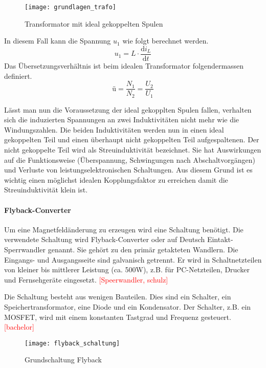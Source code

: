 \begin{figure}[H]
	\centering
	\texttt{[image: grundlagen\_trafo]}
	\caption{Transformator mit ideal gekoppelten Spulen}\label{fig:trafo}
\end{figure}

In diesem Fall kann die Spannung $ u_{1} $ wie folgt berechnet werden.
\begin{equation}\label{eq:induktionsspannung}
u_{1}=L \cdot \frac{\mathrm{d} i_{L}}{\mathrm{d} t}
\end{equation}
Das Übersetzungsverhältnis ist beim idealen Transformator folgendermassen definiert.
\begin{equation}\label{eq:übertragung}
ü= \frac{N_{1}}{N_{2}} = \frac{U_{2}}{U_{1}}
\end{equation}

Lässt man nun die Voraussetzung der ideal gekopplten Spulen fallen, verhalten sich die induzierten Spannungen an zwei Induktivitäten nicht mehr wie die Windungszahlen. Die beiden Induktivitäten werden nun in einen ideal gekoppelten Teil und einen überhaupt nicht gekoppelten Teil aufgespaltenen. Der nicht gekoppelte Teil wird als Streuinduktivität bezeichnet. Sie hat Auswirkungen auf die Funktionsweise (Überspannung, Schwingungen nach Abschaltvorgängen) und Verluste von leistungselektronischen Schaltungen. Aus diesem Grund ist es wichtig einen möglichst idealen Kopplungsfaktor zu erreichen damit die Streuinduktivität klein ist. 

\paragraph{Flyback-Converter}
Um eine Magnetfeldänderung zu erzeugen wird eine Schaltung benötigt. Die verwendete Schaltung wird Flyback-Converter oder auf Deutsch Eintakt-Sperrwandler genannt. Sie gehört zu den primär getakteten Wandlern. Die Eingangs- und Ausgangsseite sind galvanisch getrennt. Er wird in Schaltnetzteilen von kleiner bis mittlerer Leistung (ca. 500W), z.B. für PC-Netzteilen, Drucker und Fernsehgeräte eingesetzt. \textcolor{red}{[Speerwandler, schulz]}

Die Schaltung besteht aus wenigen Bauteilen. Dies sind ein Schalter, ein Speichertransformator, eine Diode und ein Kondensator. Der Schalter, z.B. ein MOSFET, wird mit einem konstanten Tastgrad und Frequenz gesteuert. \textcolor{red}{[bachelor]}

\begin{figure}[H]
\centering
\texttt{[image: flyback\_schaltung]}
\caption{Grundschaltung Flyback}\label{fig:flyback_schaltung}
\end{figure}

